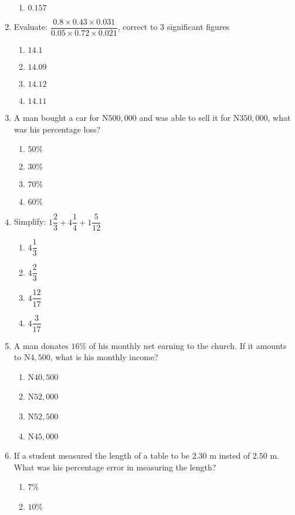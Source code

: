 \begin{multicols}{2}
\begin{enumerate}[label={\arabic*.}]
\begin{enumerate}[label={\Alph*.}]
    \item \(0.157\)
    \end{enumerate}
\item Evaluate: \(\dfrac{0.8 \times 0.43 \times 0.031}{0.05 \times 0.72 \times 0.021}\), correct to 3 significant figures
    \begin{enumerate}[label={\Alph*.}]
    \item \(14.1\)
    \item \(14.09\)
    \item \(14.12\)
    \item \(14.11\)
    \end{enumerate}
\item A man bought a car for N\(500, 000\) and was able to sell it for N\(350, 000\), what was his percentage loss?
    \begin{enumerate}[label={\Alph*.}]
    \item \(50\%\)
    \item \(30\%\)
    \item \(70\%\)
    \item \(60\%\)
    \end{enumerate}
\item Simplify: \(1{\dfrac{2}{3}} + 4{\dfrac{1}{4}} + 1{\dfrac{5}{12}}\)
    \begin{enumerate}[label={\Alph*.}]
    \item \(4\dfrac{1}{3}\)
    \item \(4\dfrac{2}{3}\)
    \item \(4\dfrac{12}{17}\)
    \item \(4\dfrac{3}{17}\)
    \end{enumerate}
\item A man donates \(16\%\) of his monthly net earning to the church. If it amounts to N\(4,500\), 
what is his monthly income? 
    \begin{enumerate}[label={\Alph*.}]
    \item N\(40,500\)
    \item N\(52,000\)
    \item N\(52,500\)
    \item N\(45,000\)
    \end{enumerate}
\item If a student measured the length of a table to be \(2.30\) m insted of \(2.50\) m. 
What was his percentage error in measuring the length?
    \begin{enumerate}[label={\Alph*.}]
    \item \(7\)\%
    \item \(10\)\%

\end{enumerate}
\end{enumerate}
\end{multicols}
